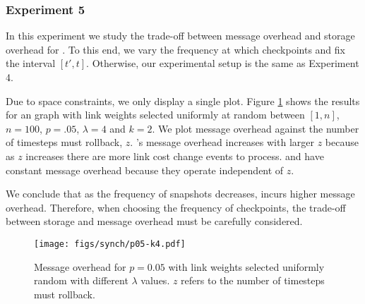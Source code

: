 \begin{figure*}[t]
\centering
{}
\caption{Message overhead for $p=0.05$ \er with link weights selected uniformly random with different $\lambda$ values.}
\label{fig:lc-p05}
\end{figure*} 


\subsubsection{Experiment 5}

In this experiment we study the trade-off between message overhead and storage overhead for \cprs. To this end, we vary the frequency at which \cpr checkpoints and fix 
the interval $[t',t]$. Otherwise, our experimental setup is the same as Experiment 4.

Due to space constraints, we only display a single plot. Figure \ref{fig:lc-fixk} shows the results for an \er graph with link weights selected uniformly at random between $[1,n]$,
$n=100$, $p=.05$, $\lambda=4$ and $k=2$. We plot message overhead against the number of timesteps \cpr must rollback, $z$. \cprs's message overhead increases with larger $z$ 
because as $z$ increases there are more link cost change events to process. \second and \purge have constant message overhead because they operate independent of $z$.

We conclude that as the frequency of \cpr snapshots decreases, \cpr incurs higher message overhead.  Therefore, when choosing the frequency of checkpoints,
the trade-off between storage and message overhead must be carefully considered. 


\begin{figure}[t]
\centering
\texttt{[image: figs/synch/p05-k4.pdf]}
\caption{Message overhead for $p=0.05$ \er with link weights selected uniformly random with different $\lambda$ values. $z$ refers to the number of timesteps \cpr must 
rollback.}
\label{fig:lc-fixk}
\end{figure} 


